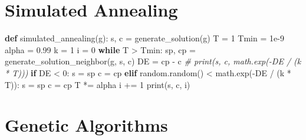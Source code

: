 \documentclass[11pt]{article}
\newenvironment{Shaded}{}{}
\newcommand{\KeywordTok}[1]{\textcolor[rgb]{0.00,0.44,0.13}{\textbf{{#1}}}}
\newcommand{\DecValTok}[1]{\textcolor[rgb]{0.25,0.63,0.44}{{#1}}}
\newcommand{\FloatTok}[1]{\textcolor[rgb]{0.25,0.63,0.44}{{#1}}}
\newcommand{\CommentTok}[1]{\textcolor[rgb]{0.38,0.63,0.69}{\textit{{#1}}}}
\newcommand{\NormalTok}[1]{{#1}}
\newcommand{\ControlFlowTok}[1]{\textcolor[rgb]{0.00,0.44,0.13}{\textbf{{#1}}}}
\newcommand{\OperatorTok}[1]{\textcolor[rgb]{0.40,0.40,0.40}{{#1}}}
\newcommand{\BuiltInTok}[1]{{#1}}
\begin{document}
    \section{Simulated Annealing}\label{simulated-annealing}

\begin{Shaded}
\begin{Highlighting}[]
\KeywordTok{def} \NormalTok{simulated_annealing(g):}
    \NormalTok{s, c }\OperatorTok{=} \NormalTok{generate_solution(g)}
    \NormalTok{T }\OperatorTok{=} \DecValTok{1}
    \NormalTok{Tmin }\OperatorTok{=} \FloatTok{1e-9}
    \NormalTok{alpha }\OperatorTok{=} \FloatTok{0.99}
    \NormalTok{k }\OperatorTok{=} \DecValTok{1}
    \NormalTok{i }\OperatorTok{=} \DecValTok{0}
    \ControlFlowTok{while} \NormalTok{T }\OperatorTok{>} \NormalTok{Tmin:}
        \NormalTok{sp, cp }\OperatorTok{=} \NormalTok{generate_solution_neighbor(g, s, c)}
        \NormalTok{DE }\OperatorTok{=} \NormalTok{cp }\OperatorTok{-} \NormalTok{c}
        \CommentTok{# print(s, c, math.exp(-DE / (k * T)))}
        \ControlFlowTok{if} \NormalTok{DE }\OperatorTok{<} \DecValTok{0}\NormalTok{:}
            \NormalTok{s }\OperatorTok{=} \NormalTok{sp}
            \NormalTok{c }\OperatorTok{=} \NormalTok{cp}
        \ControlFlowTok{elif} \NormalTok{random.random() }\OperatorTok{<} \NormalTok{math.exp(}\OperatorTok{-}\NormalTok{DE }\OperatorTok{/} \NormalTok{(k }\OperatorTok{*} \NormalTok{T)):}
            \NormalTok{s }\OperatorTok{=} \NormalTok{sp}
            \NormalTok{c }\OperatorTok{=} \NormalTok{cp}
        \NormalTok{T }\OperatorTok{*=} \NormalTok{alpha}
        \NormalTok{i }\OperatorTok{+=} \DecValTok{1}
    \BuiltInTok{print}\NormalTok{(s, c, i)}
\end{Highlighting}
\end{Shaded}

    \section{Genetic Algorithms}\label{genetic-algorithms}
\end{document}
